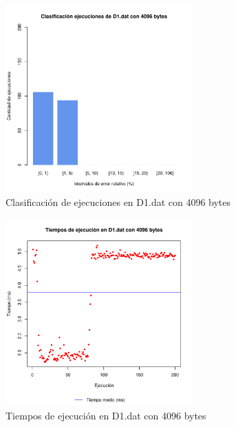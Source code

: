 \begin{figure}[h!]
    \centering
        \includegraphics[width=0.64\textwidth]{../figs/D1/plot_count_4096.pdf}
        \caption{Clasificación de ejecuciones en D1.dat con 4096 bytes}
    \label{figura:D1_count_4096}
\end{figure}

\begin{figure}[h!]
    \centering
        \includegraphics[width=0.64\textwidth]{../figs/D1/plot_time_4096.pdf}
        \caption{Tiempos de ejecución en D1.dat con 4096 bytes}
    \label{figura:D1_time_4096}
\end{figure}

\clearpage
